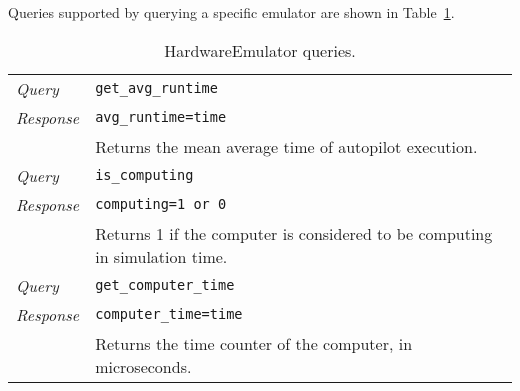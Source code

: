 Queries supported by querying a specific emulator are shown in Table~\ref{tab:emuqueries}.

\begin{table}[!htb]
    \begin{tabularx}{\textwidth}{ >{\em}l | X |}
        \cline{2-2}
        Query       & \texttt{get\_avg\_runtime} \\ 
        Response    & \texttt{avg\_runtime=time} \\
                    & Returns the mean average time of autopilot execution.\\ \cline{2-2}
        Query       & \texttt{is\_computing} \\ 
        Response    & \texttt{computing=1 or 0} \\
                    & Returns 1 if the computer is considered to be computing in simulation time.\\ \cline{2-2}
        Query       & \texttt{get\_computer\_time} \\ 
        Response    & \texttt{computer\_time=time} \\
                    & Returns the time counter of the computer, in microseconds.\\ \cline{2-2}
    \end{tabularx}
    \caption{HardwareEmulator queries.}
    \label{tab:emuqueries}
\end{table}



